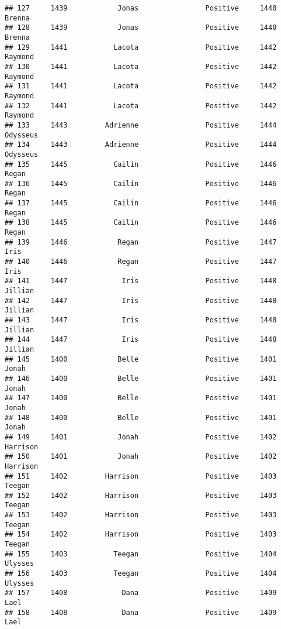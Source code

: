 \documentclass[
]{article}
\begin{document}
\begin{verbatim}
## 127     1439            Jonas                Positive     1440           Brenna
## 128     1439            Jonas                Positive     1440           Brenna
## 129     1441           Lacota                Positive     1442          Raymond
## 130     1441           Lacota                Positive     1442          Raymond
## 131     1441           Lacota                Positive     1442          Raymond
## 132     1441           Lacota                Positive     1442          Raymond
## 133     1443         Adrienne                Positive     1444         Odysseus
## 134     1443         Adrienne                Positive     1444         Odysseus
## 135     1445           Cailin                Positive     1446            Regan
## 136     1445           Cailin                Positive     1446            Regan
## 137     1445           Cailin                Positive     1446            Regan
## 138     1445           Cailin                Positive     1446            Regan
## 139     1446            Regan                Positive     1447             Iris
## 140     1446            Regan                Positive     1447             Iris
## 141     1447             Iris                Positive     1448          Jillian
## 142     1447             Iris                Positive     1448          Jillian
## 143     1447             Iris                Positive     1448          Jillian
## 144     1447             Iris                Positive     1448          Jillian
## 145     1400            Belle                Positive     1401            Jonah
## 146     1400            Belle                Positive     1401            Jonah
## 147     1400            Belle                Positive     1401            Jonah
## 148     1400            Belle                Positive     1401            Jonah
## 149     1401            Jonah                Positive     1402         Harrison
## 150     1401            Jonah                Positive     1402         Harrison
## 151     1402         Harrison                Positive     1403           Teegan
## 152     1402         Harrison                Positive     1403           Teegan
## 153     1402         Harrison                Positive     1403           Teegan
## 154     1402         Harrison                Positive     1403           Teegan
## 155     1403           Teegan                Positive     1404          Ulysses
## 156     1403           Teegan                Positive     1404          Ulysses
## 157     1408             Dana                Positive     1409             Lael
## 158     1408             Dana                Positive     1409             Lael

\end{verbatim}
\end{document}
